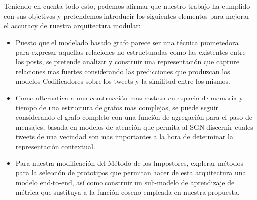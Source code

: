 \\\\
Teniendo en cuenta todo esto, podemos afirmar que nuestro trabajo ha cumplido con sus objetivos y pretendemos introducir los siguientes elementos para mejorar el accuracy de nuestra arquitectura modular:
\begin{itemize}
	\item Puesto que el modelado basado grafo parece ser una técnica prometedora para expresar aquellas relaciones no estructuradas como las existentes entre los posts, se pretende analizar y construir una representación que capture relaciones mas fuertes considerando las predicciones que produzcan los modelos Codificadores sobre los tweets y la similitud entre los mismos.
	\item Como alternativa a una construcción mas costosa en espacio de memoria y tiempo de una estructura de grafos mas complejas, se puede seguir considerando el grafo completo con una función de agregación para el paso de mensajes, basada en modelos de atención que permita al SGN discernir cuales tweets de una vecindad son mas importantes a la hora de determinar la representación contextual.
	\item Para nuestra modificación del Método de los Impostores, explorar métodos para la selección de prototipos que permitan hacer de esta arquitectura una modelo end-to-end, así como construir un sub-modelo de aprendizaje de métrica que sustituya a la función coseno empleada en nuestra propuesta.
\end{itemize}